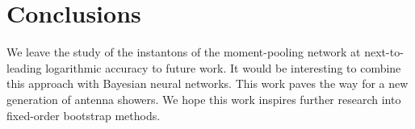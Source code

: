 \section{Conclusions}\label{sec:conclusions}

We leave the study of the instantons of the moment-pooling network at
next-to-leading logarithmic accuracy to future work. It would be
interesting to combine this approach with Bayesian neural networks. This
work paves the way for a new generation of antenna showers. We hope this
work inspires further research into fixed-order bootstrap methods.

